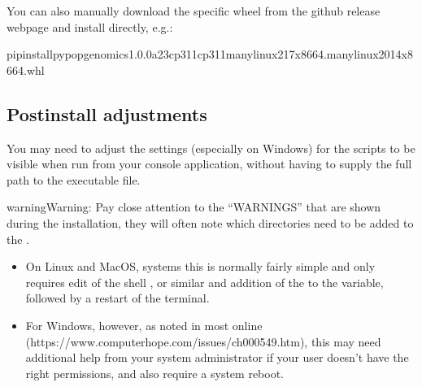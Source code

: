 \documentclass[letterpaper,10pt,english,openany,oneside]{sphinxmanual}
\begin{document}
\begin{enumerate}
\sphinxAtStartPar
You can also manually download the specific wheel from the github
release webpage and install directly, e.g.:

\begin{sphinxVerbatim}[commandchars=\\\{\}]
pipinstallpypop\PYGZhy{}genomics\PYGZhy{}1.0.0a23\PYGZhy{}cp311\PYGZhy{}cp311\PYGZhy{}manylinux\PYGZus{}2\PYGZus{}17\PYGZus{}x86\PYGZus{}64.manylinux2014\PYGZus{}x86\PYGZus{}64.whl
\end{sphinxVerbatim}

\end{enumerate}


\subsection{Post\sphinxhyphen{}install  adjustments}
\label{\detokenize{docs/guide-chapter-install:post-install-path-adjustments}}
\sphinxAtStartPar
You may need to adjust the  settings (especially on Windows)
for the  scripts to be visible when run from your console
application, without having to supply the full path to the 
executable file.

\begin{sphinxadmonition}{warning}{Warning:}
\sphinxAtStartPar
Pay close attention to the “WARNINGS” that are shown during the
 installation, they will often note which directories need to
be added to the .
\end{sphinxadmonition}
\begin{itemize}
\item {} 
\sphinxAtStartPar
On Linux and MacOS, systems this is normally fairly simple and only
requires edit of the shell , or similar and addition of
the  to the  variable, followed by a
restart of the terminal.

\item {} 
\sphinxAtStartPar
For Windows, however, as noted in most online  (https://www.computerhope.com/issues/ch000549.htm), this may need
additional help from your system administrator if your user doesn’t
have the right permissions, and also require a system reboot.

\end{itemize}
\end{document}
